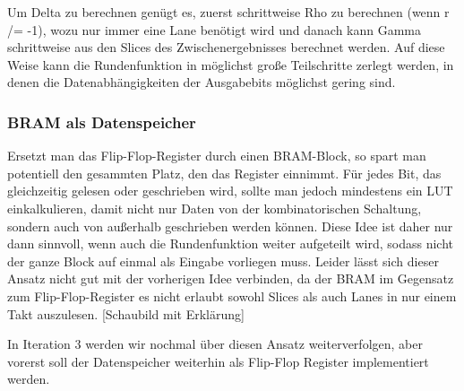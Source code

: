 Um Delta zu berechnen genügt es, zuerst schrittweise Rho zu berechnen (wenn r /= -1), wozu nur immer eine Lane benötigt wird
und danach kann Gamma schrittweise aus den Slices des Zwischenergebnisses berechnet werden.
Auf diese Weise kann die Rundenfunktion in möglichst große Teilschritte zerlegt werden, in denen die Datenabhängigkeiten der Ausgabebits möglichst gering sind.

\subsubsection{BRAM als Datenspeicher}
Ersetzt man das Flip-Flop-Register durch einen BRAM-Block, so spart man potentiell den gesammten Platz, den das Register einnimmt.
Für jedes Bit, das gleichzeitig gelesen oder geschrieben wird, sollte man jedoch mindestens ein LUT einkalkulieren,
damit nicht nur Daten von der kombinatorischen Schaltung, sondern auch von außerhalb geschrieben werden können.
Diese Idee ist daher nur dann sinnvoll, wenn auch die Rundenfunktion weiter aufgeteilt wird, sodass nicht der ganze Block auf einmal als Eingabe vorliegen muss.
Leider lässt sich dieser Ansatz nicht gut mit der vorherigen Idee verbinden, da der BRAM im Gegensatz zum Flip-Flop-Register es nicht erlaubt sowohl Slices als auch Lanes in nur einem Takt auszulesen.
[Schaubild mit Erklärung]

In Iteration 3 werden wir nochmal über diesen Ansatz weiterverfolgen, aber vorerst soll der Datenspeicher weiterhin als Flip-Flop Register implementiert werden.

